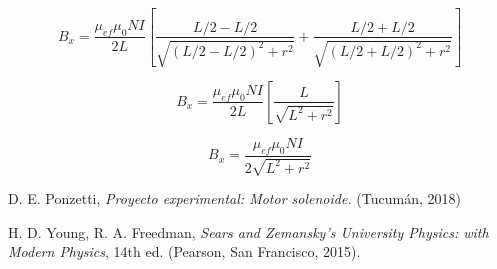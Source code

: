 \documentclass[a4paper,12pt]{article}
\begin{document}
    \begin{equation*}
        B_x = \frac{\mu_{ef}\mu_0 N I}{2L} \left[ \frac{L/2 - L/2}{\sqrt{(L/2 - L/2)^2 + r^2}} + \frac{L/2 + L/2}{\sqrt{(L/2 + L/2)^2 + r^2}} \right]
    \end{equation*}

    \begin{equation*}
        B_x = \frac{\mu_{ef}\mu_0 N I}{2L} \left[ \frac{L}{\sqrt{L^2 + r^2}} \right]
    \end{equation*}
    
    \begin{equation*}
        B_x = \frac{\mu_{ef}\mu_0 N I}{2\sqrt{L^2 + r^2}}
    \end{equation*}

\begin{thebibliography}{99}

    \bibitem{} D. E. Ponzetti, \emph{Proyecto experimental: Motor solenoide.} (Tucumán, 2018)

    \bibitem{} H. D. Young, R. A. Freedman, \emph{Sears and Zemansky's University Physics: with Modern Physics}, 14th ed. (Pearson, San Francisco, 2015).

\end{thebibliography}
\end{document}
